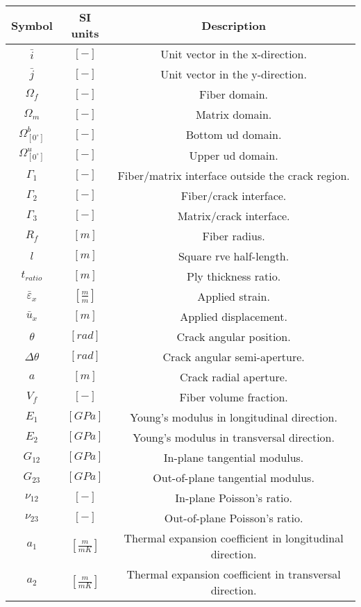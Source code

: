 \begin{table}[htbp]
  \centering
    \begin{tabular}{ccc}
  \textbf{Symbol}&\textbf{SI units}&  \textbf{Description}\\
    \midrule
$\bar{i}$&$\left[-\right]$&Unit vector in the x-direction.\\
$\bar{j}$&$\left[-\right]$&Unit vector in the y-direction.\\
$\Omega_{f}$&$\left[-\right]$&Fiber domain.\\
$\Omega_{m}$&$\left[-\right]$&Matrix domain.\\
$\Omega_{[0^{\circ}]}^{b}$&$\left[-\right]$&Bottom \gls{ud} domain.\\
$\Omega_{[0^{\circ}]}^{u}$&$\left[-\right]$&Upper \gls{ud} domain.\\
$\Gamma_{1}$&$\left[-\right]$&Fiber/matrix interface outside the crack region.\\
$\Gamma_{2}$&$\left[-\right]$&Fiber/crack interface.\\
$\Gamma_{3}$&$\left[-\right]$&Matrix/crack interface.\\
$R_{f}$&$\left[m\right]$&Fiber radius.\\
$l$&$\left[m\right]$&Square \gls{rve} half-length.\\
$t_{ratio}$&$\left[m\right]$&Ply thickness ratio.\\
$\bar{\varepsilon}_{x}$&$\left[\frac{m}{m}\right]$&Applied strain.\\
$\bar{u}_{x}$&$\left[m\right]$&Applied displacement.\\
$\theta$&$\left[rad\right]$&Crack angular position.\\
$\Delta\theta$&$\left[rad\right]$&Crack angular semi-aperture.\\
$a$&$\left[m\right]$&Crack radial aperture.\\
$V_{f}$&$\left[-\right]$&Fiber volume fraction.\\
$E_{1}$&$\left[GPa\right]$&Young's modulus in longitudinal direction.\\
$E_{2}$&$\left[GPa\right]$&Young's modulus in transversal direction.\\
$G_{12}$&$\left[GPa\right]$&In-plane tangential modulus.\\
$G_{23}$&$\left[GPa\right]$&Out-of-plane tangential modulus.\\
$\nu_{12}$&$\left[-\right]$&In-plane Poisson's ratio.\\
$\nu_{23}$&$\left[-\right]$&Out-of-plane Poisson's ratio.\\
$a_{1}$&$\left[\frac{m}{mK}\right]$&Thermal expansion coefficient in longitudinal direction.\\
$a_{2}$&$\left[\frac{m}{mK}\right]$&Thermal expansion coefficient in transversal direction.\\
    \end{tabular}%
\end{table}%